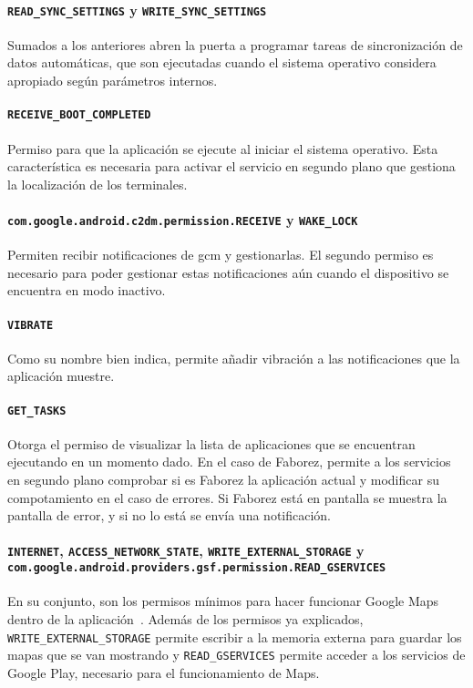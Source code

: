 \documentclass[main]{subfiles}
\begin{document}
\paragraph{\texttt{READ_SYNC_SETTINGS} y \texttt{WRITE_SYNC_SETTINGS}} Sumados a los anteriores abren la puerta a programar tareas de sincronización de datos automáticas, que son ejecutadas cuando el sistema operativo considera apropiado según parámetros internos.

\paragraph{\texttt{RECEIVE_BOOT_COMPLETED}} Permiso para que la aplicación se ejecute al iniciar el sistema operativo. Esta característica es necesaria para activar el servicio en segundo plano que gestiona la localización de los terminales.

\paragraph{\texttt{com.google.android.c2dm.permission.RECEIVE} y \texttt{WAKE_LOCK}} Permiten recibir notificaciones de \gls{gcm} y gestionarlas. El segundo permiso es necesario para poder gestionar estas notificaciones aún cuando el dispositivo se encuentra en modo inactivo.

\paragraph{\texttt{VIBRATE}} Como su nombre bien indica, permite añadir vibración a las notificaciones que la aplicación muestre.

\paragraph{\texttt{GET_TASKS}} Otorga el permiso de visualizar la lista de aplicaciones que se encuentran ejecutando en un momento dado. En el caso de Faborez, permite a los servicios en segundo plano comprobar si es Faborez la aplicación actual y modificar su compotamiento en el caso de errores. Si Faborez está en pantalla se muestra la pantalla de error, y si no lo está se envía una notificación.

\paragraph{\texttt{INTERNET}, \texttt{ACCESS_NETWORK_STATE}, \texttt{WRITE_EXTERNAL_STORAGE} y \texttt{com.google\-.android\-.pro\-vi\-ders\-.gsf.permission.READ_GSERVICES}} En su conjunto, son los permisos mínimos para hacer funcionar Google Maps dentro de la aplicación~\autocite{maps-android-permissions}. Además de los permisos ya explicados, \texttt{WRITE_EXTERNAL_STORAGE} permite escribir a la memoria externa para guardar los mapas que se van mostrando y \texttt{READ_GSERVICES} permite acceder a los servicios de Google Play, necesario para el funcionamiento de Maps.
\end{document}
